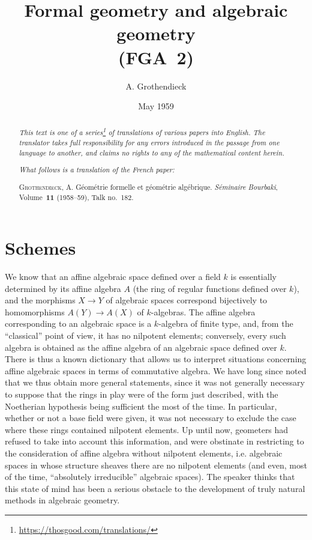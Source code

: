 \documentclass{article}
\title{Formal geometry and algebraic geometry\\(FGA~2)}
\author{A. Grothendieck}
\date{May 1959}
\theoremstyle{plain}
\newcommand{\oldpage}[1]{\marginpar{\footnotesize$\Big\vert$ \textit{p.~#1}}}
\begin{document}
\maketitle
\thispagestyle{fancy}

\renewcommand{\abstractname}{Translator's note.}

\begin{abstract}
  \renewcommand*{\thefootnote}{\fnsymbol{footnote}}
  \emph{This text is one of a series\footnote{\url{https://thosgood.com/translations/}} of translations of various papers into English.}
  \emph{The translator takes full responsibility for any errors introduced in the passage from one language to another, and claims no rights to any of the mathematical content herein.}

  \medskip
  
  \emph{What follows is a translation of the French paper:}

  \medskip\noindent
  \textsc{Grothendieck, A.}
  G\'{e}om\'{e}trie formelle et g\'{e}om\'{e}trie alg\'{e}brique.
  \emph{S\'{e}minaire Bourbaki}, Volume~\textbf{11} (1958--59), Talk no.~182.
\end{abstract}

\setcounter{footnote}{0}

\tableofcontents
\bigskip



\section{Schemes}
\label{section1}

\oldpage{182-01}
We know that an affine algebraic space defined over a field $k$ is essentially determined by its affine algebra $A$ (the ring of regular functions defined over $k$), and the morphisms $X\to Y$ of algebraic spaces correspond bijectively to homomorphisms $A(Y)\to A(X)$ of $k$-algebras.
The affine algebra corresponding to an algebraic space is a $k$-algebra of finite type, and, from the ``classical'' point of view, it has no nilpotent elements;
conversely, every such algebra is obtained as the affine algebra of an algebraic space defined over $k$.
There is thus a known dictionary that allows us to interpret situations concerning affine algebraic spaces in terms of commutative algebra.
We have long since noted that we thus obtain more general statements, since it was not generally necessary to suppose that the rings in play were of the form just described, with the Noetherian hypothesis being sufficient the most of the time.
In particular, whether or not a base field were given, it was not necessary to exclude the case where these rings contained nilpotent elements.
Up until now, geometers had refused to take into account this information, and were obstinate in restricting to the consideration of affine algebra without nilpotent elements, i.e. algebraic spaces in whose structure sheaves there are no nilpotent elements (and even, most of the time, ``absolutely irreducible'' algebraic spaces).
The speaker thinks that this state of mind has been a serious obstacle to the development of truly natural methods in algebraic geometry.
\end{document}
